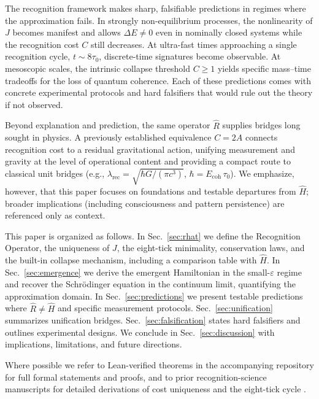 \documentclass[aps,prx,twocolumn,superscriptaddress,nofootinbib]{revtex4-2}
\newcommand{\Rhat}{\hat{R}}
\newcommand{\Hhat}{\hat{H}}
\newcommand{\Jcost}{J}
\newcommand{\Ccost}{C}
\newcommand{\TauZero}{\tau_{0}}
\begin{document}
The recognition framework makes sharp, falsifiable predictions in regimes where the approximation fails. In strongly non-equilibrium processes, the nonlinearity of \(\Jcost\) becomes manifest and allows \(\Delta E\neq 0\) even in nominally closed systems while the recognition cost \(\Ccost\) still decreases. At ultra-fast times approaching a single recognition cycle, \(t\sim 8\TauZero\), discrete-time signatures become observable. At mesoscopic scales, the intrinsic collapse threshold \(\Ccost\ge 1\) yields specific mass--time tradeoffs for the loss of quantum coherence. Each of these predictions comes with concrete experimental protocols and hard falsifiers that would rule out the theory if not observed.

Beyond explanation and prediction, the same operator \(\Rhat\) supplies bridges long sought in physics. A previously established equivalence \(\Ccost=2A\) connects recognition cost to a residual gravitational action, unifying measurement and gravity at the level of operational content and providing a compact route to classical unit bridges (e.g., \(\lambda_{\mathrm{rec}}=\sqrt{\hbar G/(\pi c^3)}\), \(\hbar=E_{\mathrm{coh}}\,\TauZero\)). We emphasize, however, that this paper focuses on foundations and testable departures from \(\Hhat\); broader implications (including consciousness and pattern persistence) are referenced only as context.

This paper is organized as follows. In Sec.~\ref{sec:rhat} we define the Recognition Operator, the uniqueness of \(\Jcost\), the eight-tick minimality, conservation laws, and the built-in collapse mechanism, including a comparison table with \(\Hhat\). In Sec.~\ref{sec:emergence} we derive the emergent Hamiltonian in the small-\(\varepsilon\) regime and recover the Schrödinger equation in the continuum limit, quantifying the approximation domain. In Sec.~\ref{sec:predictions} we present testable predictions where \(\Rhat\neq\Hhat\) and specific measurement protocols. Sec.~\ref{sec:unification} summarizes unification bridges. Sec.~\ref{sec:falsification} states hard falsifiers and outlines experimental designs. We conclude in Sec.~\ref{sec:discussion} with implications, limitations, and future directions.

Where possible we refer to Lean-verified theorems in the accompanying repository for full formal statements and proofs, and to prior recognition-science manuscripts for detailed derivations of cost uniqueness and the eight-tick cycle \cite{Quantum-Gravity,Tautology-to-Cosmos,Local-Collapse,Deductive-Measurement}.
\end{document}
